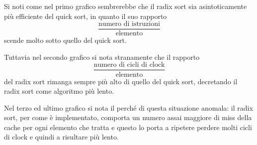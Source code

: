 \documentclass[class=book, crop=false, oneside]{standalone}
\begin{document}
Si noti come nel primo grafico sembrerebbe che il radix sort sia asintoticamente più efficiente del quick sort, in quanto il suo rapporto
\begin{equation*}
	\frac{\textrm{numero di istruzioni}}{\textrm{elemento}}
\end{equation*}
scende molto sotto quello del quick sort.

Tuttavia nel secondo grafico si nota stranamente che il rapporto
\begin{equation*}
	\frac{\textrm{numero di cicli di clock}}{\textrm{elemento}}
\end{equation*}
del radix sort rimanga sempre più alto di quello del quick sort, decretando il radix sort come algoritmo più lento.

Nel terzo ed ultimo grafico si nota il perché di questa situazione anomala: il radix sort, per come è implementato, comporta un numero assai maggiore di miss della cache per ogni elemento che tratta e questo lo porta a ripetere perdere molti cicli di clock e quindi a risultare più lento.
\end{document}
